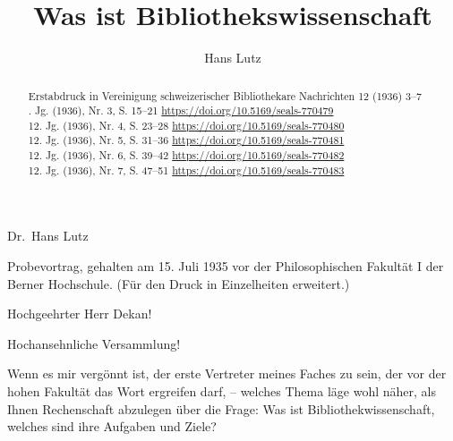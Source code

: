 \documentclass[a4paper,
fontsize=11pt,
oneside,
numbers=noperiodatend,
parskip=half-,
bibliography=totoc,
final
]{scrartcl}
\title{\LARGE{Was ist Bibliothekswissenschaft}}%
\author{Hans Lutz} %
\date{}
\begin{document}
\maketitle
\thispagestyle{fancyplain} 

\begin{abstract}
\noindent Erstabdruck in Vereinigung schweizerischer Bibliothekare Nachrichten 12
(1936) 3--7\\
. Jg. (1936), Nr. 3, S. 15--21
\href{https://doi.org/10.5169/seals-770479}{https://doi.org/10.5169/seals-770479}\\
12. Jg. (1936), Nr. 4, S. 23--28
\href{https://doi.org/10.5169/seals-770480}{https://doi.org/10.5169/seals-770480}\\
12. Jg. (1936), Nr. 5, S. 31--36
\href{https://doi.org/10.5169/seals-770480}{https://doi.org/10.5169/seals-770481}\\
12. Jg. (1936), Nr. 6, S. 39--42
\href{https://doi.org/10.5169/seals-770482}{https://doi.org/10.5169/seals-770482}\\
12. Jg. (1936), Nr. 7, S. 47--51
\href{https://doi.org/10.5169/seals-770483}{https://doi.org/10.5169/seals-770483}
\end{abstract}


\vspace*{1em}

Dr.~Hans Lutz

Probevortrag, gehalten am 15. Juli 1935 vor der Philosophischen Fakultät
I der Berner Hochschule. (Für den Druck in Einzelheiten erweitert.)

\vspace*{1em}

Hochgeehrter Herr Dekan!

Hochansehnliche Versammlung!

Wenn es mir vergönnt ist, der erste Vertreter meines Faches zu sein, der
vor der hohen Fakultät das Wort ergreifen darf, -- welches Thema läge
wohl näher, als Ihnen Rechenschaft abzulegen über die Frage: Was ist
Bibliothekwissenschaft, welches sind ihre Aufgaben und Ziele?
\end{document}
